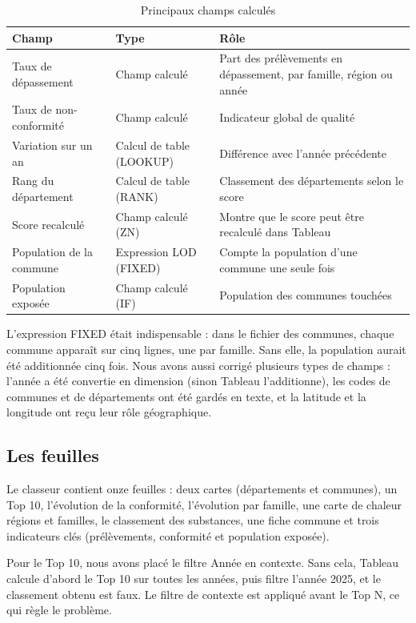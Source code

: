 \documentclass[11pt,a4paper]{article}
\begin{document}
\begin{table}[H]
\centering
\small
\begin{tabular}{>{\raggedright}p{4cm} >{\raggedright}p{3.2cm} >{\raggedright\arraybackslash}p{6.6cm}}
\toprule
Champ & Type & Rôle \\
\midrule
Taux de dépassement & Champ calculé & Part des prélèvements en dépassement, par famille, région ou année \\
Taux de non-conformité & Champ calculé & Indicateur global de qualité \\
Variation sur un an & Calcul de table (LOOKUP) & Différence avec l'année précédente \\
Rang du département & Calcul de table (RANK) & Classement des départements selon le score \\
Score recalculé & Champ calculé (ZN) & Montre que le score peut être recalculé dans Tableau \\
Population de la commune & Expression LOD (FIXED) & Compte la population d'une commune une seule fois \\
Population exposée & Champ calculé (IF) & Population des communes touchées \\
\bottomrule
\end{tabular}
\caption{Principaux champs calculés}
\label{tab:champs}
\end{table}

L'expression FIXED était indispensable : dans le fichier des communes, chaque commune apparaît sur cinq lignes, une par famille. Sans elle, la population aurait été additionnée cinq fois. Nous avons aussi corrigé plusieurs types de champs : l'année a été convertie en dimension (sinon Tableau l'additionne), les codes de communes et de départements ont été gardés en texte, et la latitude et la longitude ont reçu leur rôle géographique.

\subsection{Les feuilles}

Le classeur contient onze feuilles : deux cartes (départements et communes), un Top 10, l'évolution de la conformité, l'évolution par famille, une carte de chaleur régions et familles, le classement des substances, une fiche commune et trois indicateurs clés (prélèvements, conformité et population exposée).

Pour le Top 10, nous avons placé le filtre Année en contexte. Sans cela, Tableau calcule d'abord le Top 10 sur toutes les années, puis filtre l'année 2025, et le classement obtenu est faux. Le filtre de contexte est appliqué avant le Top N, ce qui règle le problème.
\end{document}
